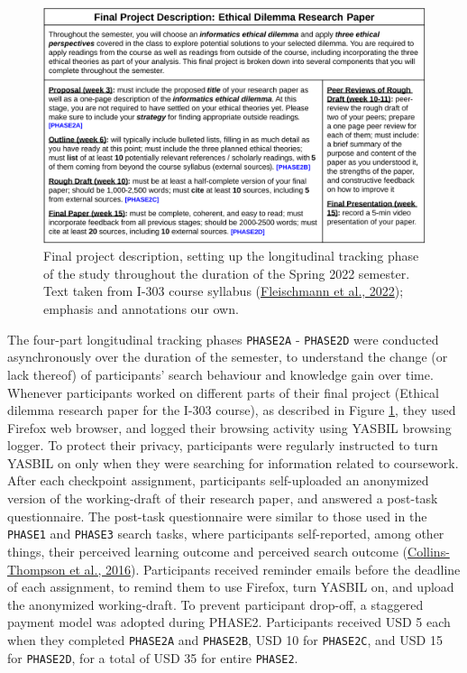 \documentclass[letterpaper, nobind]{templates/ociamthesis}
\begin{document}
\begin{figure}

{\centering \includegraphics[width=1\linewidth]{figs/final-project-description} 

}

\caption[Final project description.]{Final project description, setting up the longitudinal tracking phase of the study throughout the duration of the Spring 2022 semester. Text taken from I-303 course syllabus (\protect\hyperlink{ref-fleischmann2022i303}{Fleischmann et al., 2022}); emphasis and annotations our own.}\label{fig:final-project-description}
\end{figure}





The four-part longitudinal tracking phases \texttt{PHASE2A} - \texttt{PHASE2D} were conducted asynchronously over the duration of the semester, to understand the change (or lack thereof) of participants' search behaviour and knowledge gain over time.
Whenever participants worked on different parts of their final project (Ethical dilemma research paper for the I-303 course), as described in Figure \ref{fig:final-project-description}, they used Firefox web browser, and logged their browsing activity using YASBIL browsing logger.
To protect their privacy, participants were regularly instructed to turn YASBIL on only when they were searching for information related to coursework.
After each checkpoint assignment, participants self-uploaded an anonymized version of the working-draft of their research paper, and answered a post-task questionnaire.
The post-task questionnaire were similar to those used in the \texttt{PHASE1} and \texttt{PHASE3} search tasks, where participants self-reported, among other things, their perceived learning outcome and perceived search outcome (\protect\hyperlink{ref-collins2016assessing}{Collins-Thompson et al., 2016}).
Participants received reminder emails before the deadline of each assignment, to remind them to use Firefox, turn YASBIL on, and upload the anonymized working-draft.
To prevent participant drop-off, a staggered payment model was adopted during PHASE2.
Participants received USD 5 each when they completed \texttt{PHASE2A} and \texttt{PHASE2B}, USD 10 for \texttt{PHASE2C}, and USD 15 for \texttt{PHASE2D}, for a total of USD 35 for entire \texttt{PHASE2}.
\end{document}

